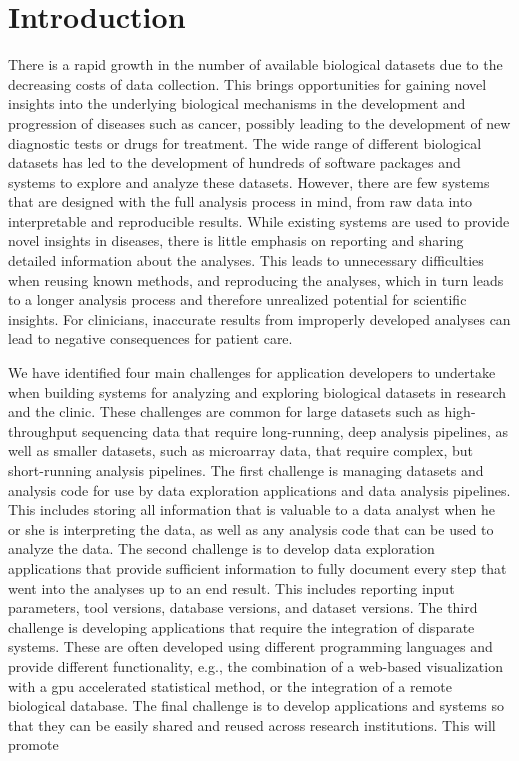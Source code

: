 \chapter{Introduction}
There is a rapid growth in the number of available biological datasets due to
the decreasing costs of data collection. This brings opportunities for gaining
novel insights into the underlying biological mechanisms in the development and
progression of diseases such as cancer, possibly leading to the development of
new diagnostic tests or drugs for treatment. The wide range of different
biological datasets has led to the development of hundreds of software packages
and systems to explore and analyze these datasets. However, there are few
systems that are designed with the full analysis process in mind, from raw data
into interpretable and reproducible results.  While existing systems are used to
provide novel insights in diseases, there is little emphasis on reporting and
sharing detailed information about the analyses. This leads to unnecessary
difficulties when reusing known methods, and reproducing the analyses, which in
turn leads to a longer analysis process and therefore unrealized potential for
scientific insights. For clinicians, inaccurate results from improperly
developed analyses can lead to negative consequences for patient
care.\cite{roy2017standards}

We have identified four main challenges for application developers to undertake
when building systems for analyzing and exploring biological datasets in
research and the clinic. These challenges are common for large datasets such as
high-throughput sequencing data that require long-running, deep analysis
pipelines, as well as smaller datasets, such as microarray data, that require
complex, but short-running analysis pipelines. The first challenge is managing
datasets and analysis code for use by data exploration applications and data
analysis pipelines. This includes storing all information that is valuable to a
data analyst when he or she is interpreting the data, as well as any analysis
code that can be used to analyze the data. The second challenge is to develop
data exploration applications that provide sufficient information to fully
document every step that went into the analyses up to an end result. This
includes reporting input parameters, tool versions, database versions, and
dataset versions. The third challenge is developing applications that require
the integration of disparate systems. These are often developed using different
programming languages and provide different functionality, e.g., the combination
of a web-based visualization with a \gls{gpu} accelerated statistical method,
or the integration of a remote biological database.
The final challenge is to develop applications and systems so that they can be
easily shared and reused across research institutions. This will promote 

